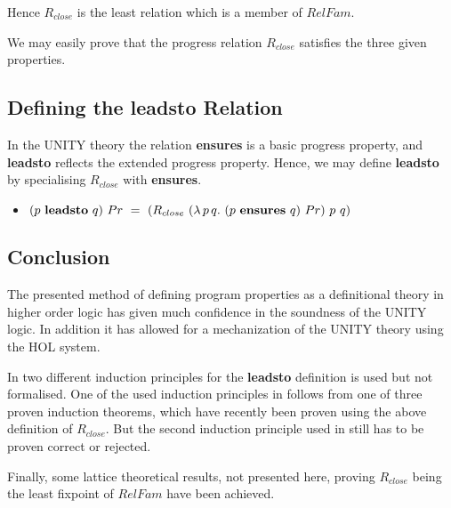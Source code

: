 \bigskip
Hence $R_{close}$ is the least relation which is a member of $RelFam$.

\bigskip
We may easily prove that the progress relation $R_{close}$ satisfies the
three given properties.

\subsection*{Defining the {\bf leadsto} Relation}

In the UNITY theory the relation {\bf ensures} is a basic progress property,
and {\bf leadsto} reflects the extended progress property. Hence, we may
define {\bf leadsto} by specialising $R_{close}$ with {\bf ensures}.

\bigskip
\begin{itemize}
  \item []
\((p\ {\bf leadsto}\ q)\ Pr\ =\
   (R_{close}\ (\lambda\, p\, q.\ (p\ {\bf ensures}\ q)\ Pr)\ p\ q)
\)
\end{itemize}

\subsection*{Conclusion}

The presented method of defining program properties as a definitional theory in
higher order logic has given much confidence in the soundness of the UNITY
logic. In addition it has allowed for a mechanization of the UNITY theory using
the HOL system.

\bigskip
In \cite{CM88} two different induction principles for the {\bf leadsto}
definition is used but not formalised. One of the used induction principles in
\cite{CM88} follows from one of three proven induction theorems, which have
recently been proven using the above definition of $R_{close}$. But
the second induction principle used in \cite{CM88} still has to be proven
correct or rejected.

\bigskip
Finally, some lattice theoretical results, not presented here, proving
$R_{close}$ being the least fixpoint of $RelFam$ have been achieved.

